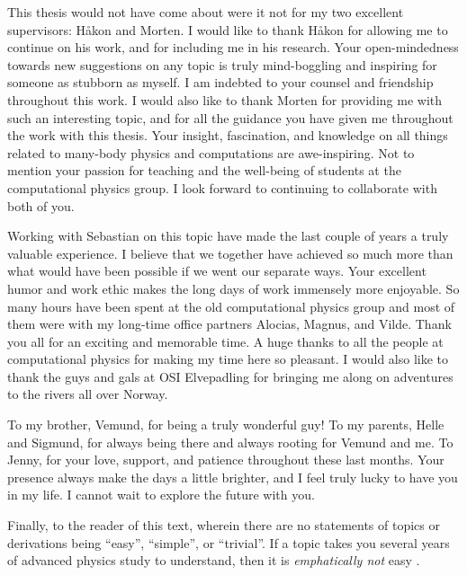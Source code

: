 This thesis would not have come about were it not for my two excellent
supervisors: Håkon and Morten.
I would like to thank Håkon for allowing me to continue on his work, and for
including me in his research.
Your open-mindedness towards new suggestions on any topic is truly mind-boggling
and inspiring for someone as stubborn as myself.
I am indebted to your counsel and friendship throughout this work.
I would also like to thank Morten for providing me with such an interesting
topic, and for all the guidance you have given me throughout the work with this
thesis.
Your insight, fascination, and knowledge on all things related to many-body
physics and computations are awe-inspiring.
Not to mention your passion for teaching and the well-being of students at the
computational physics group.
I look forward to continuing to collaborate with both of you.

Working with Sebastian on this topic have made the last couple of years a truly
valuable experience.
I believe that we together have achieved so much more than what would have been
possible if we went our separate ways.
Your excellent humor and work ethic makes the long days of work immensely more
enjoyable.
So many hours have been spent at the old computational physics group and most
of them were with my long-time office partners Alocias, Magnus, and Vilde.
Thank you all for an exciting and memorable time.
A huge thanks to all the people at computational physics for making my time here
so pleasant.
I would also like to thank the guys and gals at OSI Elvepadling for bringing me
along on adventures to the rivers all over Norway.

To my brother, Vemund, for being a truly wonderful guy!
To my parents, Helle and Sigmund, for always being there and always rooting for
Vemund and me.
To Jenny, for your love, support, and patience throughout these last months.
Your presence always make the days a little brighter, and I feel truly lucky to
have you in my life.
I cannot wait to explore the future with you.



Finally, to the reader of this text, wherein there are no statements of topics
or derivations being ``easy'', ``simple'', or ``trivial''.
If a topic takes you several years of advanced physics study to understand, then
it is \emph{emphatically not} easy \cite{nontrivial-manifesto}.
